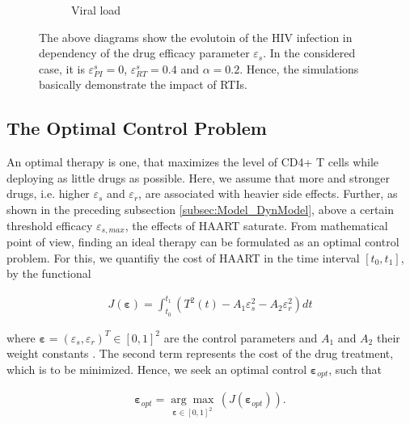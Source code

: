 \begin{figure}
\begin{subfigure}[b]{0.475\textwidth}
        \caption[]%
        {{\small Viral load}}    
        \label{fig3c:viral_load}
    \end{subfigure}
    \caption[]{The above diagrams show the evolutoin of the HIV infection in dependency of the drug efficacy parameter $\varepsilon_s$.
    In the considered case, it is $\varepsilon_{PI}^s =0$, $\varepsilon_{RT}^s = 0.4$ and $\alpha = 0.2$.
    Hence, the simulations basically demonstrate the impact of RTIs.}
    \label{fig3:evolution_over_epsilon}
\end{figure}

\subsection{The Optimal Control Problem}
\label{subsec:Model_OptControl}

An optimal therapy is one, that maximizes the level of CD4+ T cells while deploying as little drugs as possible.
Here, we assume that more and stronger drugs, i.e. higher $\varepsilon_s$ and $\varepsilon_r$, are associated with heavier 
side effects. 
Further, as shown in the preceding subsection \ref{subsec:Model_DynModel}, above a certain threshold efficacy $\varepsilon_{s,max}$, the effects of 
HAART saturate.\newline
From mathematical point of view, finding an ideal therapy can be formulated as an optimal control problem.
For this, we quantifiy the cost of HAART in the time interval $[t_0,t_1]$, by the functional

\begin{align}
    J(\mathbf{\varepsilon}) = \int_{t_0}^{t_1} \left(T^2(t) - A_1 \varepsilon_{s}^2 - A_2 \varepsilon_{r}^2\right) dt
    \label{equ:cost_function}
\end{align}

where $\mathbf{\varepsilon} = (\varepsilon_s, \varepsilon_r)^T \in [0,1]^2$ are the control parameters and $A_1$ and $A_2$ their 
weight constants \cite{adams2005hiv,wu2010game}.
The second term represents the cost of the drug treatment, which is to be minimized.
Hence, we seek an optimal control $\mathbf{\varepsilon}_{opt}$, such that

\begin{align}
    \mathbf{\varepsilon}_{opt} = \underset{\mathbf{\varepsilon} \in [0,1]^2}{\arg\max}\, (J(\mathbf{\varepsilon}_{opt})) \text{.}
    \label{equ:opti_control}
\end{align}
